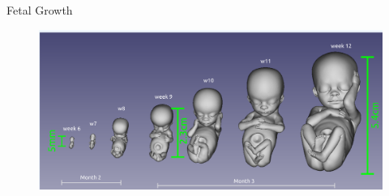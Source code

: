 {
\begin{frame}{Fetal Growth}
      \begin{figure}
        \centering
        \includegraphics[width=1.0\textwidth]{./figures/fetal-ages/versions/drawing-v01.png}
      \end{figure}
\end{frame}
}
